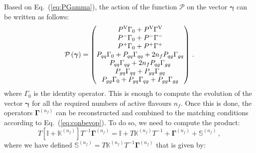 \documentclass[10pt,a4paper]{article}
\begin{document}
Based on Eq.~(\ref{eq:PGamma}), the action of the function
$\mathcal{P}$ on the vector ${\bm \gamma}$ can be written as follows:
\begin{equation}
\mathcal{P}\left({\bm \gamma}\right) =
\begin{pmatrix}
P^{\rm V}\Gamma_0 +P^{\rm V}\Gamma^{\rm V}\\
P^-\Gamma_0 +P^-\Gamma^-\\
P^+\Gamma_0 +P^+\Gamma^+\\
P_{qq}\Gamma_0+P_{qq}\Gamma_{qq}+2n_fP_{qg}\Gamma_{gq}\\
P_{qq}\Gamma_{qg}+2n_fP_{qg}\Gamma_{gg}\\
P_{gq}\Gamma_{qq}+P_{gg}\Gamma_{gq}\\
P_{gg}\Gamma_0+P_{gq}\Gamma_{qg}+P_{gg}\Gamma_{gg}
\end{pmatrix}\,.
\end{equation}
where $\Gamma_0$ is the identity operator. This is enough to compute
the evolution of the vector ${\bm \gamma}$ for all the required
numbers of active flavours $n_f$. Once this is done, the operators
${\bm \Gamma^{(n_f)}}$ can be reconstructed and combined to the
matching conditions according to Eq.~(\ref{eq:conbevop}). To do so, we
need to compute the product:
\begin{equation}
T\left[\mathbb{I}+\mathbb{K}^{(n_f)}\right]T^{-1}{\bm \Gamma}^{(n_f)}=\mathbb{I} +T\mathbb{K}^{(n_f)}T^{-1}+{\bm \Gamma}^{(n_f)}+\mathbb{S}^{(n_f)}\,,
\end{equation}
where we have defined
$\mathbb{S}^{(n_f)}=T\mathbb{K}^{(n_f)} T^{-1}{\bm\Gamma}^{(n_f)}$
that is given by:
\end{document}
